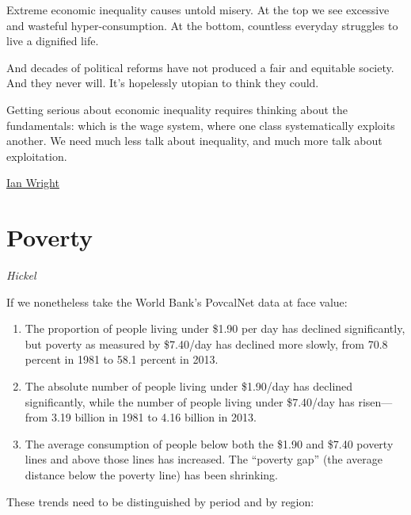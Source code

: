 \documentclass[
]{book}
\begin{document}
Extreme economic inequality causes untold misery. At the top we see excessive and wasteful hyper-consumption. At the bottom, countless everyday struggles to live a dignified life.

And decades of political reforms have not produced a fair and equitable society. And they never will. It's hopelessly utopian to think they could.

Getting serious about economic inequality requires thinking about the fundamentals: which is the wage system, where one class systematically exploits another. We need much less talk about inequality, and much more talk about exploitation.

\href{https://ianwrightsite.wordpress.com/2017/11/16/the-social-architecture-of-capitalism/}{Ian Wright}

\hypertarget{poverty}{%
\section{Poverty}\label{poverty}}

\emph{Hickel}

If we nonetheless take the World Bank's PovcalNet data at face value:

\begin{enumerate}
\def\labelenumi{\arabic{enumi}.}
\setcounter{enumi}{4}
\item
  The proportion of people living under \$1.90 per day has declined significantly, but poverty as measured by \$7.40/day has declined more slowly, from 70.8 percent in 1981 to 58.1 percent in 2013.
\item
  The absolute number of people living under \$1.90/day has declined significantly, while the number of people living under \$7.40/day has risen---from 3.19 billion in 1981 to 4.16 billion in 2013.
\item
  The average consumption of people below both the \$1.90 and \$7.40 poverty lines and above those lines has increased. The ``poverty gap'' (the average distance below the poverty line) has been shrinking.
\end{enumerate}

These trends need to be distinguished by period and by region:
\end{document}
